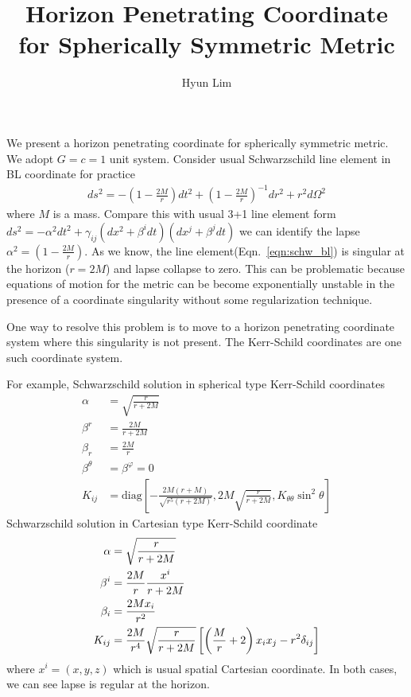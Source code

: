 \documentclass[prd]{revtex4}
\begin{document}
\title{Horizon Penetrating Coordinate for Spherically Symmetric Metric}

\author{Hyun Lim}

\maketitle

We present a horizon penetrating coordinate for spherically symmetric metric. We adopt $G=c=1$ unit system. Consider usual Schwarzschild line element in BL coordinate for practice
\begin{align}
\label{eqn:schw_bl}
ds^2 = - \left(1- \frac{2M}{r} \right) dt^2 + \left(1- \frac{2M}{r} \right)^{-1} dr^2 + r^2 d\Omega^2 
\end{align}
where $M$ is a mass. Compare this with usual 3+1 line element form $ds^2 = - \alpha^2 dt^2 + \gamma_{ij} ( dx^2 + \beta^i dt)(dx^j + \beta^j dt)$ we can identify the lapse $\alpha^2 = \left(1- \frac{2M}{r} \right)$. As we know, the line element(Eqn.~\ref{eqn:schw_bl}) is singular at the horizon ($r=2M$) and lapse collapse to zero. This can be problematic because equations of motion for the metric can be become exponentially unstable in the presence of a coordinate singularity without some regularization technique.

One way to resolve this problem is to move to a horizon penetrating coordinate system where this singularity is not present. The Kerr-Schild coordinates are one such coordinate system. 

For example, Schwarzschild solution in spherical type Kerr-Schild coordinates
\begin{align}
\alpha &= \sqrt{\frac{r}{r+2M}} \\
\beta^r &= \frac{2M}{r+2M} \\
\beta_r &=\frac{2M}{r} \\
\beta^\theta &= \beta^\varphi = 0 \\
K_{ij} &= \textrm{diag} \left[ -\frac{2M(r+M)}{\sqrt{r^5 (r+2M)}} , 2M \sqrt{\frac{r}{r+2M}}, K_{\theta \theta} \sin^2 \theta \right]
\end{align}
Schwarzschild solution in Cartesian type Kerr-Schild coordinate
\begin{align}
\alpha &= \sqrt{\frac{r}{r+2M}} \\
\beta^i &= \frac{2M}{r} \frac{x^i}{r+2M} \\
\beta_i &=\frac{2M x_i}{r^2} \\
K_{ij} &= \-\frac{2M}{r^4} \sqrt{\frac{r}{r+2M}} \left[ \left( \frac{M}{r}+2 \right) x_i x_j - r^2 \delta_{ij} \right]
\end{align}
where $x^i = (x,y,z)$ which is usual spatial Cartesian coordinate. In both cases, we can see lapse is regular at the horizon.
\end{document}
